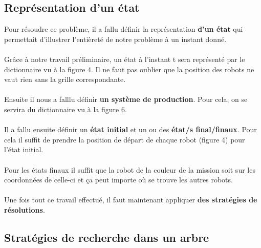 \documentclass{article}
\begin{document}
\subsection{Représentation d'un état}
Pour résoudre ce problème, il a fallu définir la représentation \textbf{d'un état} qui permettait d'illustrer l'entièreté de notre problème à un instant donné.\\\\ 
Grâce à notre travail préliminaire, un état à l'instant t sera représenté par le dictionnaire vu à la figure 4. Il ne faut pas oublier que la position des robots ne vaut rien sans la grille correspondante. \\\\
Ensuite il nous a falllu définir \textbf{un système de production}. Pour cela, on se servira du dictionnaire vu à la figure 6.\\\\
Il a fallu ensuite définir un \textbf{état initial} et un ou des \textbf{état/s final/finaux}. Pour cela il suffit de prendre la position de départ de chaque robot (figure 4) pour l'état initial.\\\\
Pour les états finaux il suffit que la robot de la couleur de la mission soit sur les coordonnées de celle-ci et ça peut importe où se trouve les autres robots.\\\\
Une fois tout ce travail effectué, il faut maintenant appliquer \textbf{des stratégies de résolutions}.
\subsection{Stratégies de recherche dans un arbre}
\end{document}
